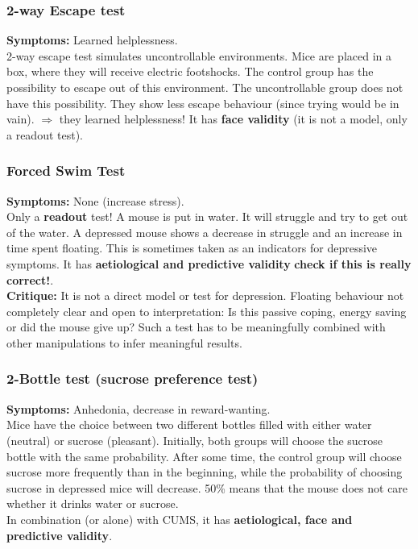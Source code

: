 \documentclass[twosided, a4paper, pt11]{article}
\begin{document}
	\subsubsection{2-way Escape test}
	\textbf{Symptoms: } Learned helplessness.\\
	2-way escape test simulates uncontrollable environments. Mice are placed in a box, where they will receive electric footshocks. The control group has the possibility to escape out of this environment. The uncontrollable group does not have this possibility. They show less escape behaviour (since trying would be in vain). $\Rightarrow$ they learned helplessness! 
	It has \textbf{face validity} (it is not a model, only a readout test).
	
	\subsubsection{Forced Swim Test}
	\textbf{Symptoms: } None (increase stress).\\
	Only a \textbf{readout} test! A mouse is put in water. It will struggle and try to get out of the water. A depressed mouse shows a decrease in struggle and an increase in time spent floating. This is sometimes taken as an indicators for depressive symptoms.
	It has \textbf{aetiological and predictive validity} \textbf{check if this is really correct!}.\\
	\textbf{Critique: }It is not a direct model or test for depression. Floating behaviour not completely clear and open to interpretation: Is this passive coping, energy saving or did the mouse give up? Such a test has to be meaningfully combined with other manipulations to infer meaningful results.
	
	\subsubsection{2-Bottle test (sucrose preference test)}
	\textbf{Symptoms: }Anhedonia, decrease in reward-wanting.\\
	Mice have the choice between two different bottles filled with either water (neutral) or sucrose (pleasant). Initially, both groups will choose the sucrose bottle with the same probability. After some time, the control group will choose sucrose more frequently than in the beginning, while the probability of choosing sucrose in depressed mice will decrease. 50\% means that the mouse does not care whether it drinks water or sucrose.\\
	In combination (or alone) with CUMS, it has \textbf{aetiological, face and predictive validity}.
	
\end{document}
